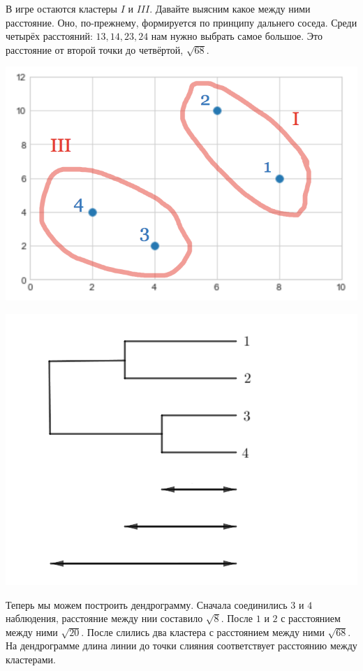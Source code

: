 \documentclass[12pt, a4paper, oneside]{article}
\begin{document}
{В игре остаются кластеры $I$ и $III$.  Давайте выясним какое между ними расстояние. Оно, по-прежнему, формируется по принципу дальнего соседа. Среди четырёх расстояний: $13, 14, 23, 24$ нам нужно выбрать самое большое. Это расстояние от второй точки до четвёртой, $\sqrt{68}$.


\begin{minipage}[t]{0.45\textwidth}
	\includegraphics[scale=0.25]{ekl3.png}
\end{minipage}
\hfill
\begin{minipage}[t]{0.45\textwidth}
	\includegraphics[scale=0.2]{ekl4.png}
\end{minipage}

Теперь мы можем построить дендрограмму. Сначала соединились $3$ и $4$  наблюдения, расстояние между нии составило $\sqrt{8}$. После $1$ и $2$ с расстоянием между ними $\sqrt{20}$. После слились два кластера с расстоянием между ними $\sqrt{68}$. На дендрограмме длина линии до точки слияния соответствует расстоянию между кластерами. 
}
\end{document}
